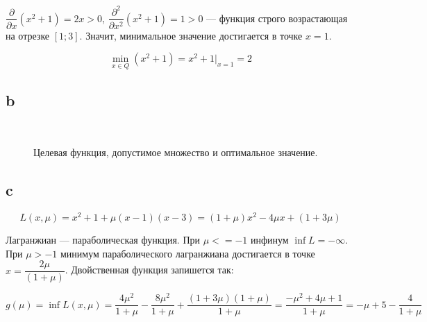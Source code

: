 	$\dfrac{\partial}{\partial x}(x^2+1)=2x > 0$, $\dfrac{\partial^2}{\partial x^2}(x^2+1)=1 > 0$ --- функция строго возрастающая на отрезке $\left[1;3\right]$. Значит, минимальное значение достигается в точке $x=1$.
	
	\begin{equation}
	\min_{x \in Q} (x^2+1) = x^2+1|_{x=1}=2
	\end{equation}
	\subsection{b}
	\begin{figure}[H]
		\\
		\caption{Целевая функция, допустимое множество и оптимальное значение.}
	\end{figure}
	\subsection{c}
	\begin{equation}
	L(x, \mu) = x^2+1 + \mu(x-1)(x-3) = (1+\mu)x^2 - 4 \mu x + (1+3\mu)
	\end{equation}
	
	Лагранжиан --- параболическая функция. При $\mu <= -1$ инфинум $\inf L = -\infty$. При $\mu > -1$ минимум параболического лагранжиана достигается в точке $x = \dfrac{2\mu}{(1+\mu)}$. Двойственная функция запишется так:
	
	\begin{equation}
	g(\mu) = \inf L(x, \mu) = \frac{4\mu^2}{1+\mu} - \frac{8\mu^2}{1+\mu} + \frac{(1+3\mu)(1+\mu)}{1+\mu} = \frac{-\mu^2 + 4\mu +1}{1+\mu} = -\mu + 5 - \frac{4}{1+\mu} 
	\end{equation}
	
